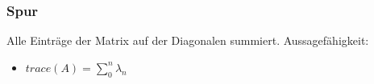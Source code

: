 \subsubsection{Spur}
Alle Einträge der Matrix auf der Diagonalen summiert.
Aussagefähigkeit:
\begin{itemize}
    \item $trace(A) = \sum_{0}^{n}{\lambda_{n}}$
\end{itemize}

